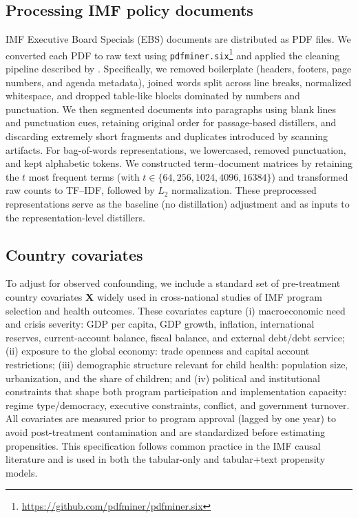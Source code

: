 \documentclass[11pt]{article}
\newcommand{\bX}{\bm{X}} %
\begin{document}
\subsection{Processing IMF policy documents}
IMF Executive Board Specials (EBS) documents are distributed as PDF files. We converted each PDF to raw text using \texttt{pdfminer.six}\footnote{\url{https://github.com/pdfminer/pdfminer.six}} and applied the cleaning pipeline described by \citet{reichl2021confounder}. Specifically, we removed boilerplate (headers, footers, page numbers, and agenda metadata), joined words split across line breaks, normalized whitespace, and dropped table-like blocks dominated by numbers and punctuation. We then segmented documents into paragraphs using blank lines and punctuation cues, retaining original order for passage-based distillers, and discarding extremely short fragments and duplicates introduced by scanning artifacts. For bag-of-words representations, we lowercased, removed punctuation, and kept alphabetic tokens. We constructed term--document matrices by retaining the $t$ most frequent terms (with $t\in\{64,256,1024,4096,16384\}$) and transformed raw counts to TF--IDF, followed by $L_2$ normalization. These preprocessed representations serve as the baseline (no distillation) adjustment and as inputs to the representation-level distillers.

\subsection{Country covariates}

To adjust for observed confounding, we include a standard set of pre-treatment country covariates $\bX$ widely used in cross-national studies of IMF program selection and health outcomes. These covariates capture (i) macroeconomic need and crisis severity: GDP per capita, GDP growth, inflation, international reserves, current-account balance, fiscal balance, and external debt/debt service; (ii) exposure to the global economy: trade openness and capital account restrictions; (iii) demographic structure relevant for child health: population size, urbanization, and the share of children; and (iv) political and institutional constraints that shape both program participation and implementation capacity: regime type/democracy, executive constraints, conflict, and government turnover. All covariates are measured prior to program approval (lagged by one year) to avoid post-treatment contamination and are standardized before estimating propensities. This specification follows common practice in the IMF causal literature and is used in both the tabular-only and tabular+text propensity models.
\end{document}
